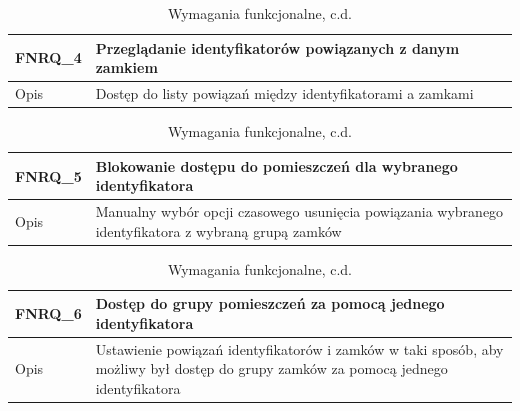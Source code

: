         \pagebreak  

        \begin{table}[h!]
            \ContinuedFloat
            \caption{Wymagania funkcjonalne, c.d.}
            \begin{subtable}[c]{\textwidth}
                \centering
                 \begin{tabular}{|p{2cm}|p{12cm}|}
                    \hline FNRQ\_4      & \textbf{Przeglądanie identyfikatorów powiązanych z danym zamkiem} \\
                    \hline \cellcolor[gray]{0.8} Opis         & Dostęp do listy powiązań między identyfikatorami a zamkami \\
                    \hline
                \end{tabular}
                \label{tbl:fnrq4}
                \vspace{10mm}           
            \end{subtable}
        \quad%
            \begin{subtable}[c]{\textwidth}
                \centering
                 \begin{tabular}{|p{2cm}|p{12cm}|}
                    \hline FNRQ\_5      & \textbf{Blokowanie dostępu do pomieszczeń dla wybranego identyfikatora}  \\
                    \hline \cellcolor[gray]{0.8} Opis         & Manualny wybór opcji czasowego usunięcia powiązania wybranego identyfikatora z wybraną grupą zamków \\
                    \hline
                \end{tabular}
                \label{tbl:fnrq5}
                \vspace{10mm}           
            \end{subtable}
        \quad%
            \begin{subtable}[c]{\textwidth}
                \centering
                 \begin{tabular}{|p{2cm}|p{12cm}|}
                    \hline FNRQ\_6      & \textbf{Dostęp do grupy pomieszczeń za pomocą jednego identyfikatora}  \\
                    \hline \cellcolor[gray]{0.8} Opis         & Ustawienie powiązań identyfikatorów i zamków w taki sposób, aby możliwy był dostęp do grupy zamków za pomocą jednego identyfikatora \\
                    \hline
                \end{tabular}
                \label{tbl:fnrq6}

\end{subtable}
\end{table}
